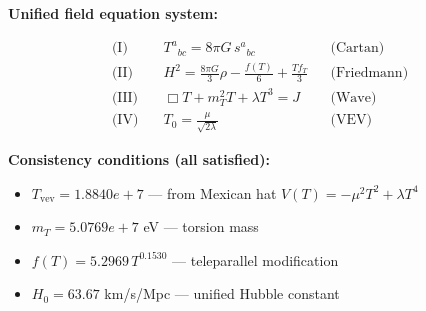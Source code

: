 
\textbf{Unified field equation system:}

\begin{align}
  \text{(I)} \quad & T^a{}_{bc} = 8\pi G \, s^a{}_{bc} && \text{(Cartan)} \\
  \text{(II)} \quad & H^2 = \frac{8\pi G}{3}\rho - \frac{f(T)}{6} + \frac{Tf_T}{3} && \text{(Friedmann)} \\
  \text{(III)} \quad & \Box T + m_T^2 T + \lambda T^3 = J && \text{(Wave)} \\
  \text{(IV)} \quad & T_0 = \frac{\mu}{\sqrt{2\lambda}} && \text{(VEV)}
\end{align}

\textbf{Consistency conditions (all satisfied):}
\begin{itemize}
  \item $T_{\text{vev}} = 1.8840e+7$ — from Mexican hat $V(T) = -\mu^2 T^2 + \lambda T^4$
  \item $m_T = 5.0769e+7$ eV — torsion mass
  \item $f(T) = 5.2969 \, T^{0.1530}$ — teleparallel modification
  \item $H_0 = 63.67$ km/s/Mpc — unified Hubble constant
\end{itemize}